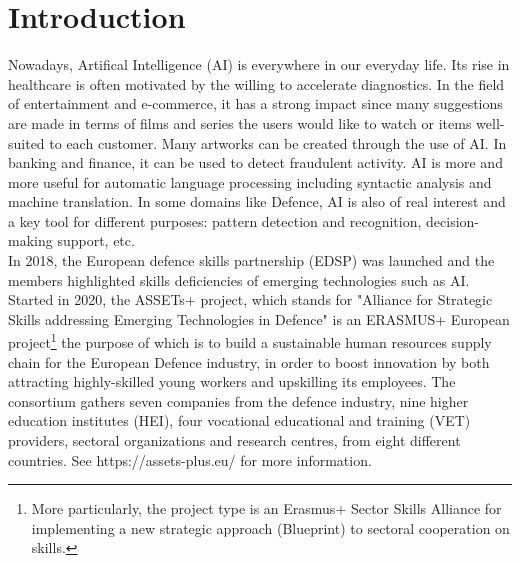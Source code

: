 \documentclass[conference]{IEEEtran}
\begin{document}
\section{Introduction}
Nowadays, Artifical Intelligence (AI) is everywhere in our everyday life. Its rise in healthcare is often motivated by the willing to accelerate diagnostics. In the field of entertainment and e-commerce, it has a strong impact since many suggestions are made in terms of films and series the users would like to watch or items well-suited to each customer. Many artworks can be created through the use of AI. In banking and finance, it can be used to detect fraudulent activity. AI is more and more useful for  automatic language processing including
syntactic analysis and machine translation. In some domains like Defence, AI is also of real interest and a key tool for different purposes: pattern detection and recognition, decision-making support, etc.
\\ In 2018,  the European defence skills partnership (EDSP) was launched and the members highlighted skills deficiencies of emerging technologies such as AI. 
 Started in 2020, the ASSETs+ project, which stands for "Alliance for Strategic Skills addressing Emerging Technologies in Defence"  is an ERASMUS+ European project\footnote{More particularly, the project type is an Erasmus+ Sector Skills Alliance for implementing a new strategic approach (Blueprint) to sectoral cooperation on skills.} the purpose of which is to build a sustainable human resources supply chain for the European Defence industry, in order to boost innovation by both attracting highly-skilled young workers and upskilling its employees.  The consortium gathers seven companies from the defence industry, nine higher education institutes (HEI), four vocational educational and training (VET) providers, sectoral organizations and research centres, from eight different countries. See https://assets-plus.eu/ for more information.
\end{document}
